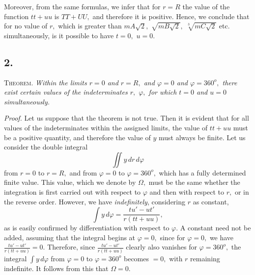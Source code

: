 \documentclass[14pt]{memoir}
\theoremstyle{plain}
\theoremstyle{remark}
\begin{document}
Moreover, from the same formulas, we infer that for \(r=R\) the value of the function \(tt+uu\) is \(TT+UU,\) and therefore it is positive. Hence, we conclude that for no value of \(r,\) which is greater than \(mA\sqrt{2},\) \(\sqrt{mB\sqrt{2}},\) \(\sqrt[3]{mC\sqrt{2}}\) etc. simultaneously, is it possible to have \(t=0,\) \(u=0.\)

\subsection*{2.}

\textsc{Theorem.} \textit{Within the limits \(r=0\) and \(r=R,\) and \(\varphi=0\) and \(\varphi=360^o,\) there exist certain values of the indeterminates \(r,\) \(\varphi,\) for which \(t=0\) and \(u=0\) simultaneously.}

\textit{Proof.} Let us suppose that the theorem is not true.  Then it is evident that for all values of the indeterminates within the assigned limits, the value of \(tt+uu\)  must be a positive quantity, and therefore the value of \(y\) must always be finite. Let us consider the double integral
\[\iint y \,dr\,d\varphi\]
from \(r=0\) to \(r=R,\) and from \(\varphi=0\) to \(\varphi=360^o,\) which has a fully determined finite value.  This value, which we denote by \(\Omega,\) must be the same whether the integration is first carried out with respect to \(\varphi\) and then with respect to \(r,\) or in the reverse order. However, we have \textit{indefinitely}, considering \(r\) as constant,
\[\int y \,d\varphi = \frac{tu'-ut'}{r(tt+uu)},\]
as is easily confirmed by differentiation with respect to \(\varphi\).  A constant need not be added, assuming that the integral begins at \(\varphi=0,\) since for \(\varphi=0,\) we have \(\frac{tu'-ut'}{r(tt+uu)}=0\). Therefore, since \(\frac{tu'-ut'}{r(tt+uu)}\) clearly also vanishes for \(\varphi=360^o,\) the integral \(\displaystyle \int y\,d\varphi\) from \(\varphi=0\) to \(\varphi=360^o\) becomes \(=0,\) with \(r\) remaining indefinite.  It follows from this that \(\Omega=0.\)
\end{document}
